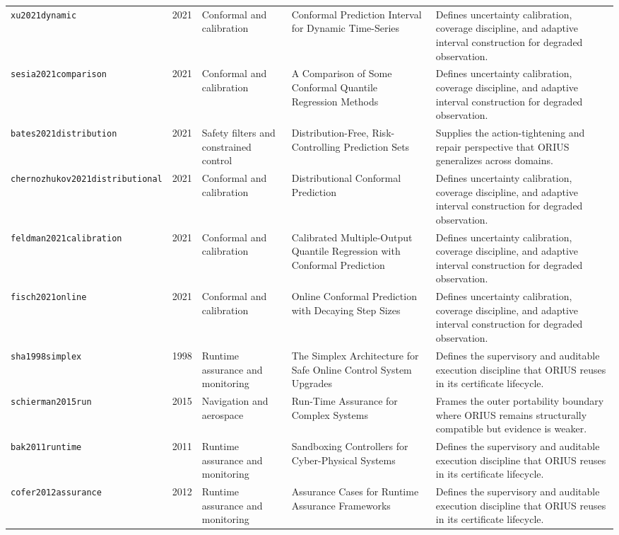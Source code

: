 \begin{longtable}{p{}p{}p{}p{}p{}}
\texttt{xu2021dynamic} & 2021 & Conformal and calibration & Conformal Prediction Interval for Dynamic Time-Series & Defines uncertainty calibration, coverage discipline, and adaptive interval construction for degraded observation.\\
\texttt{sesia2021comparison} & 2021 & Conformal and calibration & A Comparison of Some Conformal Quantile Regression Methods & Defines uncertainty calibration, coverage discipline, and adaptive interval construction for degraded observation.\\
\texttt{bates2021distribution} & 2021 & Safety filters and constrained control & Distribution-Free, Risk-Controlling Prediction Sets & Supplies the action-tightening and repair perspective that ORIUS generalizes across domains.\\
\texttt{chernozhukov2021distributional} & 2021 & Conformal and calibration & Distributional Conformal Prediction & Defines uncertainty calibration, coverage discipline, and adaptive interval construction for degraded observation.\\
\texttt{feldman2021calibration} & 2021 & Conformal and calibration & Calibrated Multiple-Output Quantile Regression with Conformal Prediction & Defines uncertainty calibration, coverage discipline, and adaptive interval construction for degraded observation.\\
\texttt{fisch2021online} & 2021 & Conformal and calibration & Online Conformal Prediction with Decaying Step Sizes & Defines uncertainty calibration, coverage discipline, and adaptive interval construction for degraded observation.\\
\texttt{sha1998simplex} & 1998 & Runtime assurance and monitoring & The Simplex Architecture for Safe Online Control System Upgrades & Defines the supervisory and auditable execution discipline that ORIUS reuses in its certificate lifecycle.\\
\texttt{schierman2015run} & 2015 & Navigation and aerospace & Run-Time Assurance for Complex Systems & Frames the outer portability boundary where ORIUS remains structurally compatible but evidence is weaker.\\
\texttt{bak2011runtime} & 2011 & Runtime assurance and monitoring & Sandboxing Controllers for Cyber-Physical Systems & Defines the supervisory and auditable execution discipline that ORIUS reuses in its certificate lifecycle.\\
\texttt{cofer2012assurance} & 2012 & Runtime assurance and monitoring & Assurance Cases for Runtime Assurance Frameworks & Defines the supervisory and auditable execution discipline that ORIUS reuses in its certificate lifecycle.\\

\end{longtable}
